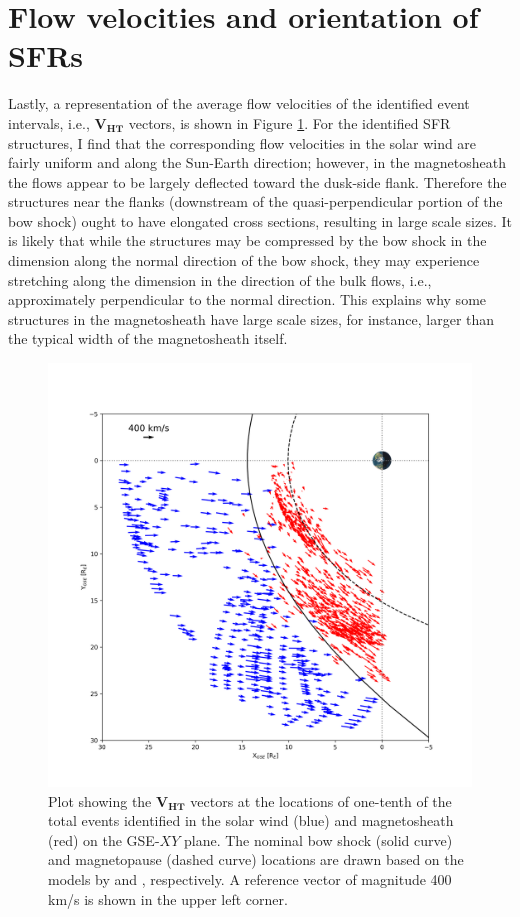 \section{Flow velocities and orientation of SFRs}
Lastly, a representation of the average flow velocities of the identified event intervals, i.e., $\mathbf{V_{HT}}$ vectors, is shown in Figure \ref{fig:VHT-xy}. For the identified SFR structures, I find that the corresponding flow velocities in the solar wind are fairly uniform and along the Sun-Earth direction; however, in the magnetosheath the flows appear to be largely deflected toward the dusk-side flank. Therefore the structures near the flanks (downstream of the quasi-perpendicular portion of the bow shock) ought to have elongated cross sections, resulting in large scale sizes. It is likely that while the structures may be compressed by the bow shock in the dimension along the normal direction of the bow shock, they may experience stretching along the dimension in the direction of the bulk flows, i.e., approximately perpendicular to the normal direction. This explains why some structures in the magnetosheath have large scale sizes, for instance, larger than the typical width of the magnetosheath itself.

\begin{figure}
    \centering
    \includegraphics[width=\textwidth]{Figures/Orbits/VHT_xy.png}
    \caption[Orbit plot of flow vectors associated with the SFRs]{Plot showing the $\mathbf{V_{HT}}$ vectors at the locations of one-tenth of the total events identified in the solar wind (blue) and magnetosheath (red) on the GSE-$XY$ plane. The nominal bow shock (solid curve) and magnetopause (dashed curve) locations are drawn based on the models by \citet{Shue:1997} and \citet{SlavinHolzer:1984}, respectively. A reference vector of magnitude 400 km/s is shown in the upper left corner.}
    \label{fig:VHT-xy}
\end{figure}

